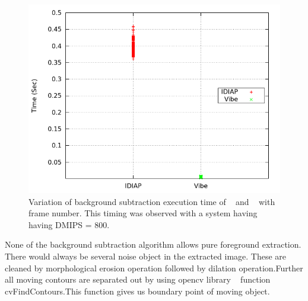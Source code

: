 \begin{figure}[!b]
\centering
\includegraphics[scale=0.60]{Figures/bg_compare}
\caption{Variation of background subtraction execution time of ~\cite{11}
and ~\cite{9} with frame number. This timing was observed with a system
having having DMIPS = 800.}
\label{bg_compare}
\end{figure}

None of the background subtraction algorithm allows pure foreground
extraction. There would always be several noise object in the extracted
image. These are cleaned by morphological erosion operation followed by
dilation operation.Further all moving contours are separated out by
using opencv library ~\cite{34} function cvFindContours.This function
gives us boundary point of moving object.


